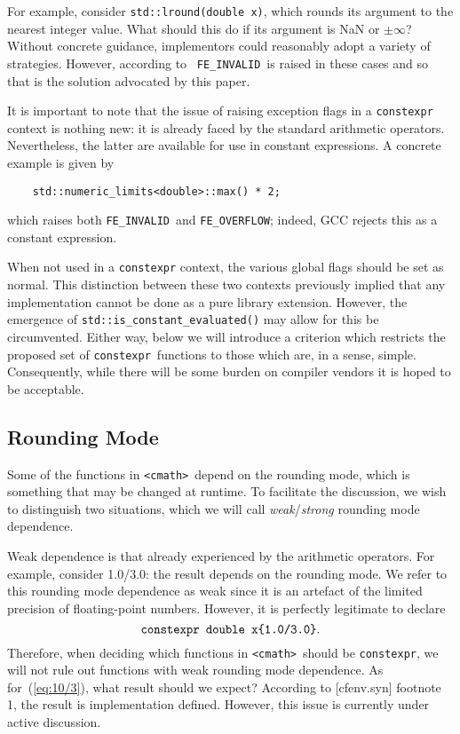 \documentclass[prd,twocolumn,amsmath,amssymb,nofootinbib,eqsecnum]{revtex4-1}
\newcommand{\constexpr}{\code{constexpr}\xspace}
\newcommand{\code}[1]{{\tt #1}}
\newcommand{\header}[1]{{\tt <#1>}}
\newcommand{\cmath}{\header{cmath}}
\newcommand{\FEINVALID}{{\tt FE\_INVALID}}
\newcommand{\FEOVERFLOW}{{\tt FE\_OVERFLOW}}
\newcommand{\eq}[1]{(\ref{eq:#1})}
\begin{document}
For example, consider \code{std::lround(double x)}, which rounds its argument to the nearest integer value.
What should this do if its argument is NaN or $\pm \infty$? Without concrete guidance, implementors could reasonably adopt a variety of strategies. However, according to~\cite{CLang} \FEINVALID\ is raised in these cases and so that is the solution advocated by this paper.

It is important to note that the issue of raising exception flags in a \constexpr context is nothing new: it is already faced by the standard arithmetic operators. Nevertheless, the latter are available for use in constant expressions. A concrete example is given by
\begin{Verbatim}
	std::numeric_limits<double>::max() * 2;	
\end{Verbatim}
which raises both \FEINVALID\ and \FEOVERFLOW; indeed, GCC rejects this as a constant expression.

When not used in a \constexpr context, the various global
flags should be set as normal. This distinction between these two contexts previously 
implied that any implementation cannot be done as a pure library extension. However, the emergence of \code{std::is\_constant\_evaluated()} \cite{ConstEval} may allow for this be circumvented.
Either way, below
we will introduce a criterion which restricts the proposed set of \constexpr\ functions 
to those which are, in a sense, simple. Consequently, while there will be some burden 
on compiler vendors it is hoped to be acceptable. 

\subsection{Rounding Mode}
\label{sec:rounding}

Some of the functions in \cmath\ depend on the rounding mode, which is something that may be changed at runtime. To facilitate the discussion, we wish to distinguish two situations, which we will call \emph{weak}/\emph{strong} rounding mode dependence. 

Weak dependence is that already experienced by the arithmetic operators. For example, consider 1.0/3.0: the result depends on the rounding mode. We refer to this rounding mode dependence as weak since it is an artefact of the limited precision of floating-point numbers. However, it is perfectly legitimate to declare
\begin{equation}
	\mbox{\code{constexpr double x\{1.0/3.0\}}}.
\label{eq:10/3}
\end{equation}
Therefore, when deciding which functions in \cmath\ should be \constexpr, we will not rule out functions with weak rounding mode dependence.
As for~\eq{10/3}, what result should we expect? According to [cfenv.syn] footnote 1, the result is implementation defined. However, this issue is currently under active discussion. 
\end{document}
